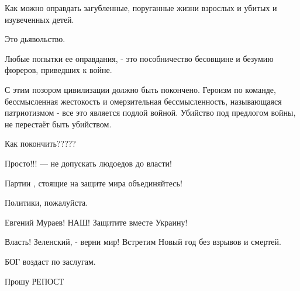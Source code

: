 Как можно оправдать загубленные, поруганные жизни взрослых и убитых и изувеченных детей.  

Это дьявольство.

Любые попытки ее оправдания, - это пособничество бесовщине и безумию фюреров, приведших к войне.

С этим позором цивилизации должно быть покончено. Героизм по команде,
бессмысленная жестокость и омерзительная бессмысленность, называющаяся
патриотизмом - все это является подлой войной. Убийство под предлогом войны, не
перестаёт быть убийством. 

Как покончить?????

Просто!!! — не допускать людоедов до власти!  

Партии , стоящие на защите мира объединяйтесь! 

Политики,  пожалуйста.

Евгений Мураев! НАШ! Защитите  вместе Украину!

Власть! Зеленский, - верни мир! Встретим Новый год без взрывов и смертей. 

БОГ воздаст по заслугам.

Прошу РЕПОСТ
